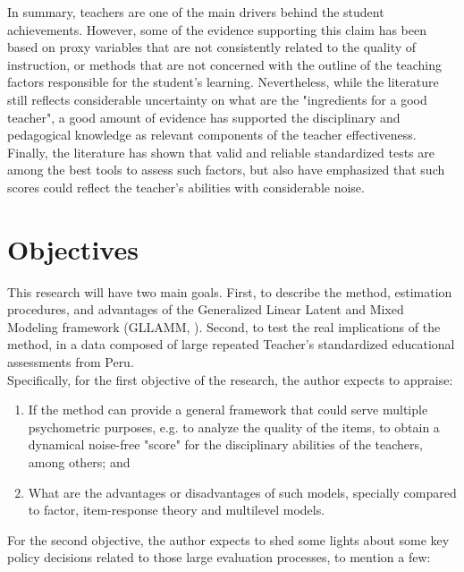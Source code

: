 In summary, teachers are one of the main drivers behind the student achievements. However, some of the evidence supporting this claim has been based on proxy variables that are not consistently related to the quality of instruction, or methods that are not concerned with the outline of the teaching factors responsible for the student's learning. Nevertheless, while the literature still reflects considerable uncertainty on what are the "ingredients for a good teacher", a good amount of evidence has supported the disciplinary and pedagogical knowledge as relevant components of the teacher effectiveness. Finally, the literature has shown that valid and reliable standardized tests are among the best tools to assess such factors, but also have emphasized that such scores could reflect the teacher's abilities with considerable noise.

\section{Objectives}

This research will have two main goals. First, to describe the method, estimation procedures, and advantages of the Generalized Linear Latent and Mixed Modeling framework (GLLAMM, \citealp{Rabe_et_al_2004, Rabe_et_al_2012}). Second, to test the real implications of the method, in a data composed of large repeated Teacher's standardized educational assessments from Peru. \\

\noindent Specifically, for the first objective of the research, the author expects to appraise: 

\begin{enumerate}
	\item If the method can provide a general framework that could serve multiple psychometric purposes, e.g. to analyze the quality of the items, to obtain a dynamical noise-free "score" for the disciplinary abilities of the teachers, among others; and
	
	\item What are the advantages or disadvantages of such models, specially compared to factor, item-response theory and multilevel models.
\end{enumerate}

\noindent For the second objective, the author expects to shed some lights about some key policy decisions related to those large evaluation processes, to mention a few:

